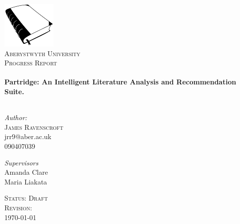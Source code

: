 \begin{titlepage}
 
\begin{center}

\includegraphics[width=0.20\textwidth]{../cover_logo.png}\\[1cm]
 
\textsc{\LARGE Aberystwyth University}\\[1.5cm]
 
\textsc{\LARGE Progress Report}\\[0.5cm]
 
 
\HRule \\[0.4cm]
{ \huge \bfseries Partridge: An Intelligent Literature Analysis and
Recommendation Suite.}\\[0.4cm]

\HRule \\[1.5cm]

\begin{minipage}{0.4\textwidth}
\begin{flushleft} \large
\emph{Author:}\\
\textsc{James Ravenscroft}\\
jrr9@aber.ac.uk\\
090407039 
\end{flushleft}
\end{minipage}
\begin{minipage}{0.4\textwidth}
\begin{flushright} \large
\emph{Supervisors} \\
Amanda Clare\\
Maria Liakata

\end{flushright}
\end{minipage}

\vfill
 
\textsc{\large Status: Draft}\\
\textsc{\large Revision: \Revision{} }\\
{\large \today}
 
\end{center}
 
\end{titlepage}

